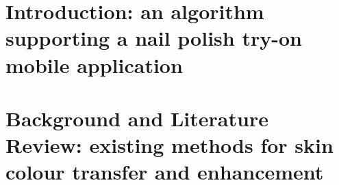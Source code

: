 \documentclass[12pt, a4paper]{article}
\begin{document}
\section{Introduction: an algorithm supporting a nail polish try-on mobile application}

\pagebreak

\section{Background and Literature Review: existing methods for skin colour transfer and enhancement}

\pagebreak



\pagebreak
\end{document}
